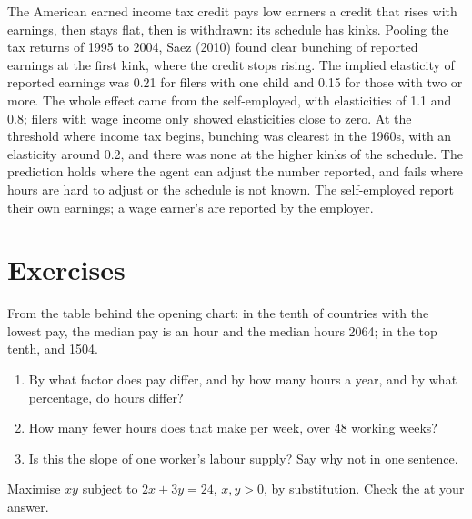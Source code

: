 \begin{record}
The American earned income tax credit pays low earners a credit that rises
with earnings, then stays flat, then is withdrawn: its schedule has kinks.
Pooling the tax returns of 1995 to 2004, Saez (2010) found clear bunching of
reported earnings at the first kink, where the credit stops rising. The
implied elasticity of reported earnings was 0.21 for filers with one child
and 0.15 for those with two or more. %
The whole effect came from the self-employed, with elasticities of 1.1 and
0.8; filers with wage income only showed elasticities close to zero. %
At the threshold where income tax begins, bunching was clearest in the
1960s, with an elasticity around 0.2, and there was none at the higher
kinks of the schedule. %
The prediction holds where the agent can adjust the number reported, and
fails where hours are hard to adjust or the schedule is not known. The self-employed
report their own earnings; a wage earner's are reported by the employer.
\end{record}

\section*{Exercises}\label{sec:b1:constrained-optimisation:exercises}

\begin{exercise}[$\star$]\label{exo:b1:constrained-optimisation:read-chart}
From the table behind the opening chart: in the tenth of countries with the
lowest pay, the median pay is  an hour and the median hours 2064;
in the top tenth,  and 1504. %
\begin{enumerate}
  \item By what factor does pay differ, and by how many hours a year, and by what percentage, do hours differ?
  \item How many fewer hours does that make per week, over 48 working weeks?
  \item Is this the slope of one worker's labour supply? Say why not in one sentence.
\end{enumerate}
\end{exercise}

\begin{exercise}[$\star$]\label{exo:b1:constrained-optimisation:substitution}
Maximise $xy$ subject to $2x + 3y = 24$, $x, y > 0$, by substitution. Check
the  at your answer.
\end{exercise}

